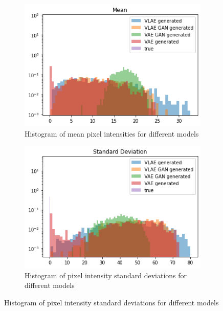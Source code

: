 \begin{figure}
    \centering
    \begin{subfigure}{0.4\textwidth}
        \centering
        \includegraphics[width=\textwidth]{images/generated_vs_true/dsprites/dsprites_vs_models_mean.png}
        \caption{Histogram of mean pixel intensities for different models}
        \label{subfig:mean_generated_vs_true_dsprites}
    \end{subfigure}
    \hfill
    \begin{subfigure}{0.4\textwidth}
        \centering
        \includegraphics[width=\textwidth]{images/generated_vs_true/dsprites/dsprites_vs_models_sd.png}
        \caption{Histogram of pixel intensity standard deviations for different models}
        \label{subfig:sd_generated_vs_true_dsprites}
    \end{subfigure}

\end{figure}
